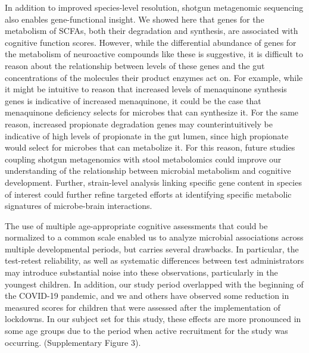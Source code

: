 \documentclass{article}
\begin{document}
In addition to improved species-level resolution, shotgun metagenomic
sequencing also enables gene-functional insight. We showed here that
genes for the metabolism of SCFAs, both their degradation and synthesis,
are associated with cognitive function scores. However, while the
differential abundance of genes for the metabolism of neuroactive
compounds like these is suggestive, it is difficult to reason about the
relationship between levels of these genes and the gut concentrations of
the molecules their product enzymes act on. For example, while it might
be intuitive to reason that increased levels of menaquinone synthesis
genes is indicative of increased menaquinone, it could be the case that
menaquinone deficiency selects for microbes that can synthesize it. For
the same reason, increased propionate degradation genes may
counterintuitively be indicative of high levels of propionate in the gut
lumen, since high propionate would select for microbes that can
metabolize it. For this reason, future studies coupling shotgun
metagenomics with stool metabolomics could improve our understanding of
the relationship between microbial metabolism and cognitive development.
Further, strain-level analysis linking specific gene content in species
of interest could further refine targeted efforts at identifying
specific metabolic signatures of microbe-brain interactions.

The use of multiple age-appropriate cognitive assessments that could be
normalized to a common scale enabled us to analyze microbial
associations across multiple developmental periods, but carries several
drawbacks. In particular, the test-retest reliability, as well as
systematic differences between test administrators may introduce
substantial noise into these observations, particularly in the youngest
children. In addition, our study period overlapped with the beginning of
the COVID-19 pandemic, and we and others have observed some reduction in
measured scores for children that were assessed after the implementation
of lockdowns. In our subject set for this study, these effects are more
pronounced in some age groups due to the period when active recruitment for
the study was occurring.
\cite{blackwellYouthWellbeingCOVID192022,deoniImpactCOVID19Pandemic2021}
(Supplementary Figure 3).


\end{document}
